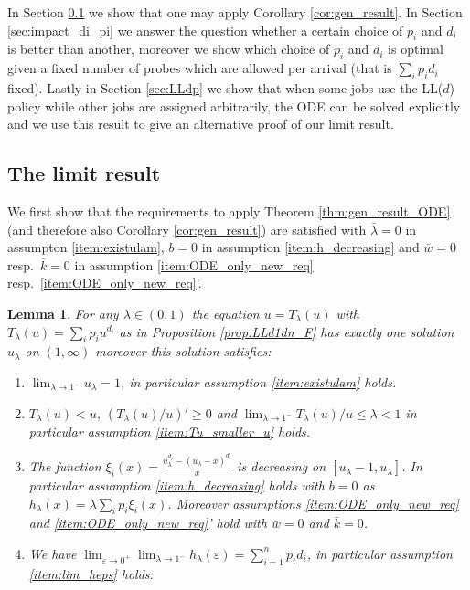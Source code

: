\documentclass[12pt]{report}
\newtheorem{lemma}[theorem]{Lemma}
\begin{document}
In Section \ref{sec:LLd1..dn} we show that one may apply Corollary \ref{cor:gen_result}. In Section \ref{sec:impact_di_pi} we answer the question whether a certain choice of $p_i$ and $d_i$ is better than another, moreover we show which choice of $p_i$ and $d_i$ is optimal given a fixed number of probes which are allowed per arrival (that is $\sum_i p_i d_i$ fixed). Lastly in Section \ref{sec:LLdp} we show that when some jobs use the LL($d$) policy while other jobs are assigned arbitrarily, the ODE can be solved explicitly and we use this result to give an alternative proof of our limit result.

\subsection{The limit result}\label{sec:LLd1..dn}
We first show that the requirements to apply Theorem \ref{thm:gen_result_ODE} (and therefore also Corollary \ref{cor:gen_result}) are satisfied with $\bar \lambda = 0$ in assumpton \ref{item:existulam}, $b=0$ in assumption \ref{item:h_decreasing} and $\bar w = 0$ resp.~$\bar k=0$ in assumption \ref{item:ODE_only_new_req} resp.~\ref{item:ODE_only_new_req}'.
\begin{lemma} \label{lem:requirements_SQd1dn}
For any $\lambda \in (0,1)$ the equation $u=T_\lambda(u)$ with $T_\lambda(u)=\sum_i p_i u^{d_i}$ as in Proposition \ref{prop:LLd1dn_F} has exactly one solution $u_{\lambda}$ on $(1,\infty)$ moreover this solution satisfies:
\begin{enumerate}[label=(\alph*),leftmargin=*]
\item $\lim_{\lambda \rightarrow 1^-} u_{\lambda} = 1$, in particular assumption \ref{item:existulam} holds. \label{enum:d1dn_1}
\item $T_\lambda(u) < u$, $(T_\lambda(u)/u)' \geq 0$ and
$\lim_{\lambda \rightarrow 1^-} T_\lambda(u)/u \leq \lambda  < 1$ in particular assumption \ref{item:Tu_smaller_u} holds.
\item The function $\xi_i(x)=\frac{u_\lambda^{d_i} - (u_\lambda - x)^{d_i}}{x}$ is decreasing on $[u_\lambda-1,u_\lambda]$. In particular assumption \ref{item:h_decreasing} holds with $b=0$
as $h_\lambda(x)=\lambda \sum_i p_i \xi_i(x)$. Moreover assumptions \ref{item:ODE_only_new_req} and \ref{item:ODE_only_new_req}' hold with $\bar w=0$ and $\bar k=0$. \label{enum:d1dn_7}
\item We have $\lim_{\varepsilon \rightarrow 0^+} \lim_{\lambda \rightarrow 1^-} h_\lambda(\varepsilon)= \sum_{i=1}^n p_i d_i$, in particular assumption \ref{item:lim_heps} holds. \label{enum:lim_heps_d1dn}
\end{enumerate}
\end{lemma}
\end{document}
